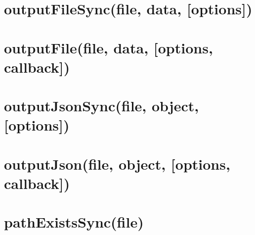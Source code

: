 \documentclass[twoside]{book}
\newcommand{\+}{\discretionary{\mbox{\scriptsize$\hookleftarrow$}}{}{}}
\begin{document}
\chapter{output\+File\+Sync(file, data, \mbox{[}options\mbox{]})}
\label{md_dsmacc_examples_DRmerge_node_modules_electron-packager_node_modules_electron-download_node_mo6212b5816d8d9ea93d4d53466d747372}

\chapter{output\+File(file, data, \mbox{[}options, callback\mbox{]})}
\label{md_dsmacc_examples_DRmerge_node_modules_electron-packager_node_modules_electron-download_node_modules_fs-extra_docs_outputFile}

\chapter{output\+Json\+Sync(file, object, \mbox{[}options\mbox{]})}
\label{md_dsmacc_examples_DRmerge_node_modules_electron-packager_node_modules_electron-download_node_mo2c244a14459957630a58a64438840991}

\chapter{output\+Json(file, object, \mbox{[}options, callback\mbox{]})}
\label{md_dsmacc_examples_DRmerge_node_modules_electron-packager_node_modules_electron-download_node_modules_fs-extra_docs_outputJson}

\chapter{path\+Exists\+Sync(file)}
\label{md_dsmacc_examples_DRmerge_node_modules_electron-packager_node_modules_electron-download_node_moebeb3fe3209a0ab09a53d800a7813c1f}

\end{document}
